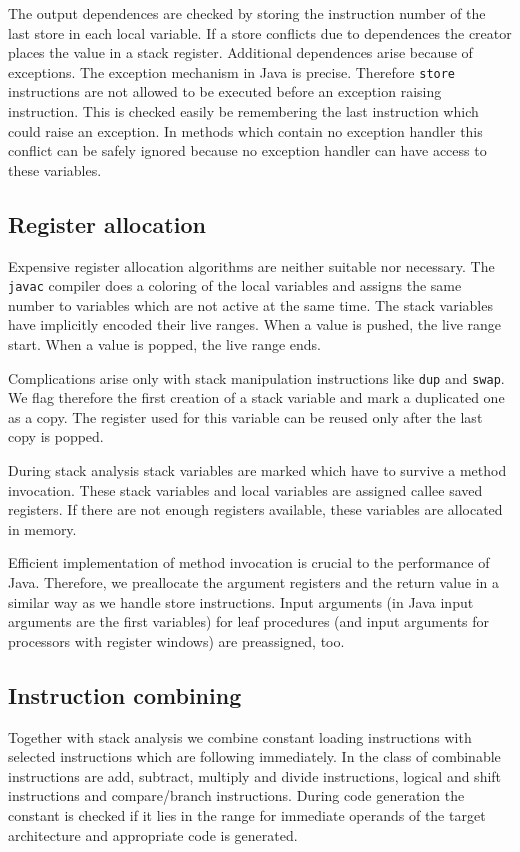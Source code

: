 The output dependences are checked by storing the instruction number of the
last store in each local variable. If a store conflicts due to dependences
the creator places the value in a stack register. Additional dependences
arise because of exceptions. The exception mechanism in Java is precise.
Therefore {\tt store} instructions are not allowed to be executed before
an exception raising instruction. This is checked easily be remembering
the last instruction which could raise an exception. In methods which contain
no exception handler this conflict can be safely ignored because no
exception handler can have access to these variables.


\subsection{Register allocation}

Expensive register allocation algorithms are neither suitable nor necessary.
The {\tt javac} compiler does a coloring of the local variables and assigns
the same number to variables which are not active at the same time. The
stack variables have implicitly encoded their live ranges. When a value is
pushed, the live range start. When a value is popped, the live range ends.

Complications arise only with stack manipulation instructions like {\tt dup}
and {\tt swap}. We flag therefore the first creation of a stack variable and
mark a duplicated one as a copy. The register used for this variable can
be reused only after the last copy is popped.

During stack analysis stack variables are marked which have to survive a
method invocation. These stack variables and local variables are assigned
callee saved registers. If there are not enough registers available,
these variables are allocated in memory.

Efficient implementation of method invocation is crucial to the performance
of Java. Therefore, we preallocate the argument registers and the return
value in a similar way as we handle store instructions. Input arguments (in
Java input arguments are the first variables) for leaf procedures (and
input arguments for processors with register windows) are preassigned, too.


\subsection{Instruction combining}

Together with stack analysis we combine constant loading instructions with
selected instructions which are following immediately. In the class of
combinable instructions are add, subtract, multiply and divide instructions,
logical and shift instructions and compare/branch instructions. During code
generation the constant is checked if it lies in the range for immediate
operands of the target architecture and appropriate code is generated.

